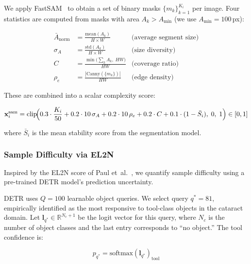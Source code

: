 We apply FastSAM~\cite{zhao2023fastsam} to obtain a set of binary masks
$\{m_k\}_{k=1}^{K_i}$ per image.  Four statistics are computed from masks
with area $A_k > A_{\min}$ (we use $A_{\min} = 100$\,px):

\begin{align}
    \bar{A}_{\text{norm}} &= \frac{\text{mean}(A_k)}{H \times W}
    & \text{(average segment size)} \\[4pt]
    \sigma_A &= \frac{\text{std}(A_k)}{H \times W}
    & \text{(size diversity)} \\[4pt]
    C &= \frac{\min\!\bigl(\sum_k A_k,\; HW\bigr)}{HW}
    & \text{(coverage ratio)} \\[4pt]
    \rho_e &= \frac{|\text{Canny}(\{m_k\})|}{HW}
    & \text{(edge density)}
\end{align}

These are combined into a scalar complexity score:

\begin{equation}
    \mathbf{x}_i^{\text{sam}} = \text{clip}\!\Bigl(
        0.3 \cdot \frac{K_i}{50}
      + 0.2 \cdot 10\,\sigma_A
      + 0.2 \cdot 10\,\rho_e
      + 0.2 \cdot C
      + 0.1 \cdot (1 - \bar{S}_i),
    \;0,\;1\Bigr)
    \in [0, 1]
\end{equation}

where $\bar{S}_i$ is the mean stability score from the segmentation model.

\subsubsection{Sample Difficulty via EL2N}
\label{sec:el2n}

Inspired by the EL2N score of Paul et~al.~\cite{paul2021deep}, we quantify
sample difficulty using a pre-trained DETR model's prediction uncertainty.

DETR uses $Q=100$ learnable object queries.  We select query $q^{*} = 81$,
empirically identified as the most responsive to tool-class objects in the
cataract domain.  Let $\mathbf{l}_{q^*} \in \mathbb{R}^{N_c+1}$ be the logit
vector for this query, where $N_c$ is the number of object classes and the
last entry corresponds to ``no object.''  The tool confidence is:

\begin{equation}
    p_{q^*} = \text{softmax}(\mathbf{l}_{q^*})_{\text{tool}}
\end{equation}

